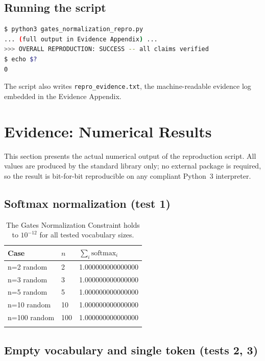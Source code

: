 \documentclass[11pt]{article}
\newcommand{\softmax}{\mathrm{softmax}}
\begin{document}
\subsection{Running the script}
\label{sec:repro-run}

\begin{lstlisting}[language=bash]
$ python3 gates_normalization_repro.py
... (full output in Evidence Appendix) ...
>>> OVERALL REPRODUCTION: SUCCESS -- all claims verified
$ echo $?
0
\end{lstlisting}

The script also writes \texttt{repro\_evidence.txt}, the machine-readable
evidence log embedded in the Evidence Appendix.

\section{Evidence: Numerical Results}
\label{sec:evidence}

This section presents the actual numerical output of the reproduction script.
All values are produced by the standard library only; no external package is
required, so the result is bit-for-bit reproducible on any compliant Python~3
interpreter.

\subsection{Softmax normalization (test 1)}
\label{sec:ev-norm}

\begin{longtable}{@{}lll@{}}
\toprule
Case & $n$ & $\sum_i \softmax_i$ \\
\midrule
n=2 random & 2 & 1.000000000000000 \\
n=3 random & 3 & 1.000000000000000 \\
n=5 random & 5 & 1.000000000000000 \\
n=10 random & 10 & 1.000000000000000 \\
n=100 random & 100 & 1.000000000000000 \\
\bottomrule
\caption{The Gates Normalization Constraint holds to $10^{-12}$ for all tested
vocabulary sizes.}
\label{tab:ev-norm}
\end{longtable}

\subsection{Empty vocabulary and single token (tests 2, 3)}
\label{sec:ev-empty}
\end{document}
